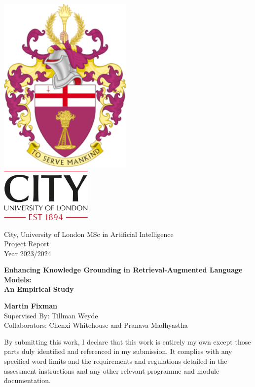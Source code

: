 \documentclass[a4paper,11pt]{article}
\begin{document}
\begin{titlepage}
	\centering
	\Large
	\sffamily

	\includegraphics[height=250pt]{to_serve_mankind.png} \\[1ex]
	\includegraphics[height=75pt]{City.png}

	City, University of London MSc in Artificial Intelligence \\
	Project Report \\
	Year 2023/2024

	\vfill{}

	\begin{huge}
		\bfseries
		Enhancing Knowledge Grounding in Retrieval-Augmented Language Models: \\[1ex]
		An Empirical Study
	\end{huge}

	\vfill{}

	\textbf{Martin Fixman} \\
	Supervised By: Tillman Weyde \\
	Collaborators: Chenxi Whitehouse and Pranava Madhyastha
\end{titlepage}
\restoregeometry{}

By submitting this work, I declare that this work is entirely my own except those parts duly identified and referenced in my submission.
It complies with any specified word limits and the requirements and regulations detailed in the assessment instructions and any other relevant programme and module documentation.
\end{document}
